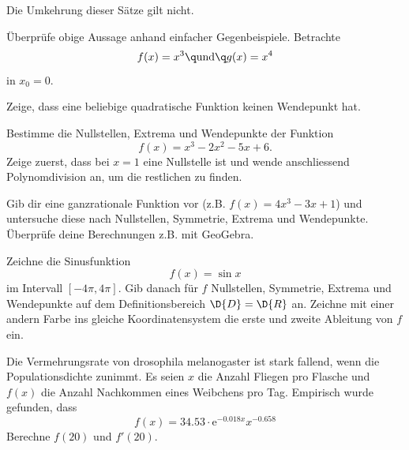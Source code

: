 \documentclass[%
11pt,%
twoside,%
titlepage,%
german,%
headsepline%
]{scrartcl}
\begin{document}
\begin{bem}
Die Umkehrung dieser S\"atze gilt nicht.
\end{bem}

\begin{ueb}[gegenbsp]
\"Uberpr\"ufe obige Aussage anhand einfacher Gegenbeispiele. Betrachte
$$f(x)=x^3\q\text{und}\q g(x)=x^4$$
in $x_0=0$.
\end{ueb}

\begin{ueb}[quadrfkt]
 Zeige, dass eine beliebige quadratische Funktion keinen Wendepunkt hat.
 \end{ueb}
 \begin{ueb}[polynomfkt]
 Bestimme die Nullstellen, Extrema und Wendepunkte der Funktion
 $$f(x) = x^3-2x^2-5x+6.$$
 Zeige zuerst, dass bei $x=1$ eine Nullstelle ist und wende anschliessend Polynomdivision an, um die restlichen zu finden.
 \end{ueb}

\begin{ueb}
Gib dir eine ganzrationale Funktion vor (z.B. $f(x)=4x^3-3x+1$) und untersuche diese nach Nullstellen, Symmetrie, Extrema und Wendepunkte. \"Uberpr\"ufe deine Berechnungen z.B. mit GeoGebra.
\end{ueb}

\begin{ueb}
Zeichne die Sinusfunktion
$$f(x) = \sin{x}$$
im Intervall $[-4\pi,4\pi]$. Gib danach f\"ur $f$ Nullstellen, Symmetrie, Extrema und Wendepunkte auf dem Definitionsbereich $\D{D}=\D{R}$ an. Zeichne mit einer andern Farbe ins gleiche Koordinatensystem die erste und zweite Ableitung von $f$ ein.
\end{ueb}

\begin{ueb}
Die Vermehrungsrate von drosophila melanogaster ist stark fallend, wenn die Populationsdichte zunimmt. Es seien $x$ die Anzahl Fliegen pro Flasche und $f(x)$ die Anzahl Nachkommen eines Weibchens pro Tag. Empirisch wurde gefunden, dass
$$f(x) =34.53\cdot \mathrm{e}^{-0.018x}x^{-0.658}$$
Berechne $f(20)$ und $f'(20)$.
\end{ueb}

\clearpage
\end{document}

